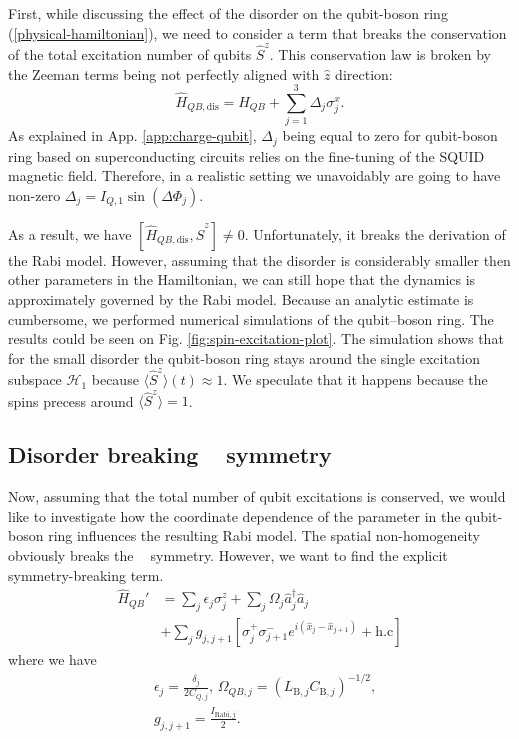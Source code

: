\documentclass[reprint, aps, prx, amsmath, amssymb, longbibliography, superscriptaddress]{revtex4-2}
\DeclareMathOperator{\Zthree}{\mathbb{Z}_3}
\begin{document}
First, while discussing the effect of the disorder on the qubit-boson ring (\ref{physical-hamiltonian}), we need to consider a term that breaks the conservation of the total excitation number of qubits $\hat S^z$. This conservation law is broken by the Zeeman terms being not perfectly aligned with $\hat z$ direction:
\begin{equation}
    \hat H_{QB,\text{dis}} = \hat H_{QB} + \sum_{j=1}^3 \Delta_j \sigma_j^x.
\end{equation}
As explained in App. \ref{app:charge-qubit}, $\Delta_j$ being equal to zero for qubit-boson ring based on superconducting circuits relies on the fine-tuning of the SQUID magnetic field. Therefore, in a realistic setting we unavoidably are going to have non-zero $\Delta_j = I_{Q,1}\sin(\Delta \Phi_j)$.



As a result, we have $[\hat H_{QB,\text{dis}}, \hat S^z] \neq 0 $. Unfortunately, it breaks the derivation of the Rabi model. However, assuming that the disorder is considerably smaller then other parameters in the Hamiltonian, we can still hope that the dynamics is approximately governed by the Rabi model. Because an analytic estimate is cumbersome, we performed numerical simulations of the qubit–boson ring. The results could be seen on Fig. \ref{fig:spin-excitation-plot}. The simulation shows that for the small disorder the qubit-boson ring stays around the single excitation subspace $\mathcal{H}_1$ because $\langle \hat S^z \rangle(t) \approx 1$. We speculate that it happens because the spins precess around $\langle \hat S^z \rangle = 1$.


\subsection{Disorder breaking \texorpdfstring{$\Zthree$}{Z3} symmetry}


Now, assuming that the total number of qubit excitations is conserved, we would like to investigate how the coordinate dependence of the parameter in the qubit-boson ring influences the resulting Rabi model. The spatial non-homogeneity obviously breaks the $\Zthree$ symmetry. However, we want to find the explicit symmetry-breaking term.
\begin{equation}
\label{rabi-breaking-disorder}
\begin{aligned}
  \hat H_{QB}' &= \sum_j \epsilon_{j} \sigma_j^z + \sum_j \Omega_j \hat a^{\dagger}_j \hat a_j  \\
  &+ \sum_j g_{j,j+1} \left[\sigma_j^+ \sigma_{j+1}^- e^{i (\hat x_j - \hat x_{j+1})} +\text{h.c}\right]
\end{aligned}
\end{equation}
where we have
\begin{equation}
\begin{aligned}
    &\epsilon_j = \frac{\delta_j}{2 C_{Q,j}},\,
    \Omega_{QB,j} = \left(L_{\text{B},j}C_{\text{B},j}\right)^{-1/2}, \\
    &g_{j,j+1} = \frac{I_{\text{Rabi},j}}{2}.
\end{aligned}
\end{equation}
\end{document}
